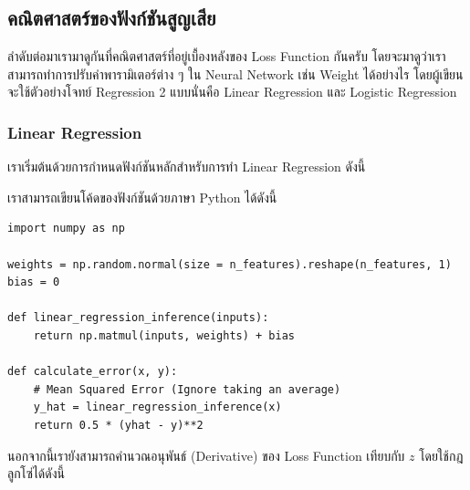 \subsection{คณิตศาสตร์ของฟังก์ชันสูญเสีย}

ลำดับต่อมาเรามาดูกันที่คณิตศาสตร์ที่อยู่เบื้องหลังของ Loss Function กันครับ โดยจะมาดูว่าเราสามารถทำการปรับค่าพารามิเตอร์ต่าง ๆ ใน Neural 
Network เช่น Weight ได้อย่างไร โดยผู้เขียนจะใช้ตัวอย่างโจทย์ Regression 2 แบบนั่นคือ Linear Regression และ Logistic Regression

\subsubsection{Linear Regression}

เราเริ่มต้นด้วยการกำหนดฟังก์ชันหลักสำหรับการทำ Linear Regression ดังนี้


เราสามารถเขียนโค้ดของฟังก์ชันด้วยภาษา Python ได้ดังนี้

\begin{lstlisting}[style=MyPython]
import numpy as np

weights = np.random.normal(size = n_features).reshape(n_features, 1)
bias = 0

def linear_regression_inference(inputs):
    return np.matmul(inputs, weights) + bias   

def calculate_error(x, y):
    # Mean Squared Error (Ignore taking an average)
    y_hat = linear_regression_inference(x)
    return 0.5 * (yhat - y)**2 
\end{lstlisting}

\vspace{1em}
นอกจากนี้เรายังสามารถคำนวณอนุพันธ์ (Derivative) ของ Loss Function เทียบกับ $z$ โดยใช้กฎลูกโซ่ได้ดังนี้

